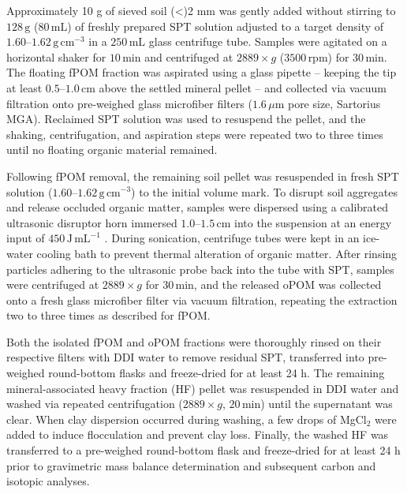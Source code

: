 \documentclass[preprint,12pt]{elsarticle}
\begin{document}
Approximately 10 g of sieved soil (<)2 mm was gently added without stirring to $128\,\text{g}$ ($80\,\text{mL}$) of freshly prepared SPT solution adjusted to a target density of $1.60\text{--}1.62\,\text{g}\,\text{cm}^{-3}$ in a $250\,\text{mL}$ glass centrifuge tube. Samples were agitated on a horizontal shaker for $10\,\text{min}$ and centrifuged at $2889 \times g$ ($3500\,\text{rpm}$) for $30\,\text{min}$. The floating fPOM fraction was aspirated using a glass pipette – keeping the tip at least $0.5\text{--}1.0\,\text{cm}$ above the settled mineral pellet – and collected via vacuum filtration onto pre-weighed glass microfiber filters ($1.6\,\mu\text{m}$ pore size, Sartorius MGA). Reclaimed SPT solution was used to resuspend the pellet, and the shaking, centrifugation, and aspiration steps were repeated two to three times until no floating organic material remained.

Following fPOM removal, the remaining soil pellet was resuspended in fresh SPT solution ($1.60\text{--}1.62\,\text{g}\,\text{cm}^{-3}$) to the initial volume mark. To disrupt soil aggregates and release occluded organic matter, samples were dispersed using a calibrated ultrasonic disruptor horn immersed $1.0\text{--}1.5\,\text{cm}$ into the suspension at an energy input of $450\,\text{J}\,\text{mL}^{-1}$ \citep{Crow2007, Guggenberger2013}. During sonication, centrifuge tubes were kept in an ice-water cooling bath to prevent thermal alteration of organic matter. After rinsing particles adhering to the ultrasonic probe back into the tube with SPT, samples were centrifuged at $2889 \times g$ for $30\,\text{min}$, and the released oPOM was collected onto a fresh glass microfiber filter via vacuum filtration, repeating the extraction two to three times as described for fPOM.

Both the isolated fPOM and oPOM fractions were thoroughly rinsed on their respective filters with DDI water to remove residual SPT, transferred into pre-weighed round-bottom flasks and freeze-dried for at least 24 h. The remaining mineral-associated heavy fraction (HF) pellet was resuspended in DDI water and washed via repeated centrifugation ($2889 \times g$, $20\,\text{min}$) until the supernatant was clear. When clay dispersion occurred during washing, a few drops of MgCl$_2$ were added to induce flocculation and prevent clay loss. Finally, the washed HF was transferred to a pre-weighed round-bottom flask and freeze-dried for at least 24 h prior to gravimetric mass balance determination and subsequent carbon and isotopic analyses.
\end{document}
